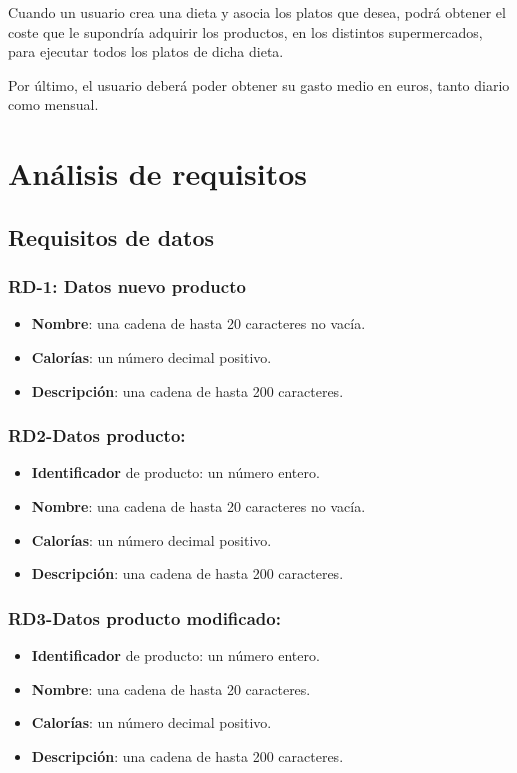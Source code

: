 \documentclass[a4paper,12pt]{report}
\begin{document}
Cuando un usuario crea una dieta y asocia los platos que desea,
podrá obtener el coste que le supondría adquirir los productos, en
los distintos supermercados, para ejecutar todos los platos de
dicha dieta.

Por último, el usuario deberá poder obtener su gasto medio en
euros, tanto diario como mensual.
\chapter{Análisis de requisitos}
\label{sec-2}
\section{Requisitos de datos}
\label{sec-2-1}
\subsection{RD-1: Datos nuevo producto}
\label{sec-2-1-1}
\begin{itemize}
\item \textbf{Nombre}: una cadena de hasta 20 caracteres no vacía.
\item \textbf{Calorías}: un número decimal positivo.
\item \textbf{Descripción}: una cadena de hasta 200 caracteres.
\end{itemize}

\subsection{RD2-Datos producto:}
\label{sec-2-1-2}
\begin{itemize}
\item \textbf{Identificador} de producto: un número entero.
\item \textbf{Nombre}: una cadena de hasta 20 caracteres no vacía.
\item \textbf{Calorías}: un número decimal positivo.
\item \textbf{Descripción}: una cadena de hasta 200 caracteres.
\end{itemize}
\subsection{RD3-Datos producto modificado:}
\label{sec-2-1-3}
\begin{itemize}
\item \textbf{Identificador} de producto: un número entero.
\item \textbf{Nombre}: una cadena de hasta 20 caracteres.
\item \textbf{Calorías}: un número decimal positivo.
\item \textbf{Descripción}: una cadena de hasta 200 caracteres.
\end{itemize}
\end{document}
